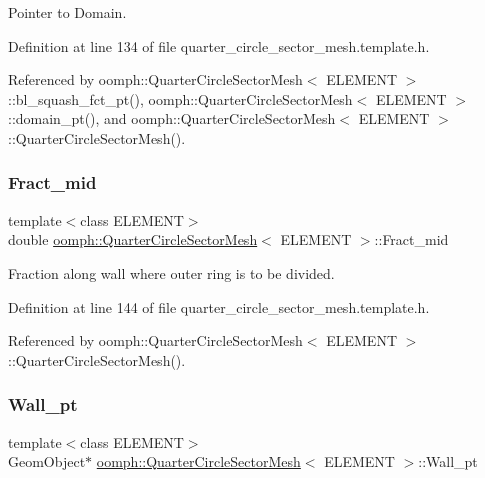 Pointer to Domain. 



Definition at line 134 of file quarter\+\_\+circle\+\_\+sector\+\_\+mesh.\+template.\+h.



Referenced by oomph\+::\+Quarter\+Circle\+Sector\+Mesh$<$ E\+L\+E\+M\+E\+N\+T $>$\+::bl\+\_\+squash\+\_\+fct\+\_\+pt(), oomph\+::\+Quarter\+Circle\+Sector\+Mesh$<$ E\+L\+E\+M\+E\+N\+T $>$\+::domain\+\_\+pt(), and oomph\+::\+Quarter\+Circle\+Sector\+Mesh$<$ E\+L\+E\+M\+E\+N\+T $>$\+::\+Quarter\+Circle\+Sector\+Mesh().

\mbox{\label{classoomph_1_1QuarterCircleSectorMesh_a149224b002f785eb357553f8210ad5d3}} 
\subsubsection{\texorpdfstring{Fract\+\_\+mid}{Fract\_mid}}
{\footnotesize\ttfamily template$<$class E\+L\+E\+M\+E\+NT$>$ \\
double \hyperlink{classoomph_1_1QuarterCircleSectorMesh}{oomph\+::\+Quarter\+Circle\+Sector\+Mesh}$<$ E\+L\+E\+M\+E\+NT $>$\+::Fract\+\_\+mid\hspace{0.3cm}{\ttfamily [protected]}}



Fraction along wall where outer ring is to be divided. 



Definition at line 144 of file quarter\+\_\+circle\+\_\+sector\+\_\+mesh.\+template.\+h.



Referenced by oomph\+::\+Quarter\+Circle\+Sector\+Mesh$<$ E\+L\+E\+M\+E\+N\+T $>$\+::\+Quarter\+Circle\+Sector\+Mesh().

\mbox{\label{classoomph_1_1QuarterCircleSectorMesh_a2cbdec5f0ee2f370c38f1fdc4e2904f8}} 
\subsubsection{\texorpdfstring{Wall\+\_\+pt}{Wall\_pt}}
{\footnotesize\ttfamily template$<$class E\+L\+E\+M\+E\+NT$>$ \\
Geom\+Object$\ast$ \hyperlink{classoomph_1_1QuarterCircleSectorMesh}{oomph\+::\+Quarter\+Circle\+Sector\+Mesh}$<$ E\+L\+E\+M\+E\+NT $>$\+::Wall\+\_\+pt\hspace{0.3cm}{\ttfamily [protected]}}



